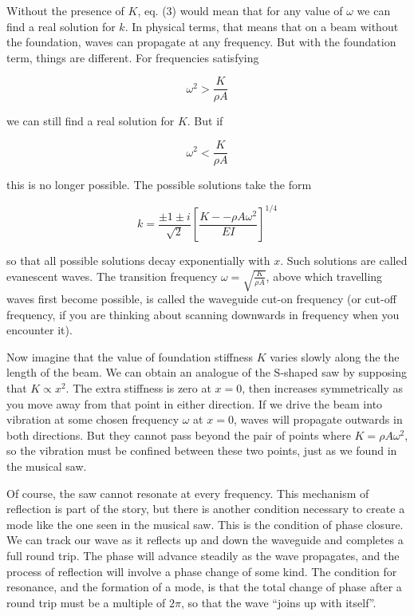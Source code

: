   Without the presence of $K$, eq. (3) would mean that for any value of 
  $\omega$ we can find a real solution for $k$. In physical terms, that means 
  that on a beam without the foundation, waves can propagate at any frequency. 
  But with the foundation term, things are different. For frequencies 
  satisfying 

  \begin{equation*}\omega^2 > \frac{K}{\rho A} \tag{4}\end{equation*} 

  \noindent{}we can still find a real solution for $K$. But if 

  \begin{equation*}\omega^2 < \frac{K}{\rho A} \tag{5}\end{equation*} 

  \noindent{}this is no longer possible. The possible solutions take the form 

  \begin{equation*}k=\frac{\pm 1 \pm i}{\sqrt{2}} \left[\dfrac{K -- \rho A 
  \omega^2 }{EI} \right]^{1/4} \tag{6}\end{equation*} 

  \noindent{}so that all possible solutions decay exponentially with $x$. Such 
  solutions are called evanescent waves. The transition frequency $\omega = 
  \sqrt{\frac{K}{\rho A} }$, above which travelling waves first become 
  possible, is called the waveguide cut-on frequency (or cut-off frequency, if 
  you are thinking about scanning downwards in frequency when you encounter 
  it). 

  Now imagine that the value of foundation stiffness $K$ varies slowly along 
  the the length of the beam. We can obtain an analogue of the S-shaped saw by 
  supposing that $K \propto x^2$. The extra stiffness is zero at $x=0$, then 
  increases symmetrically as you move away from that point in either direction. 
  If we drive the beam into vibration at some chosen frequency $\omega$ at 
  $x=0$, waves will propagate outwards in both directions. But they cannot pass 
  beyond the pair of points where $K=\rho A \omega^2$, so the vibration must be 
  confined between these two points, just as we found in the musical saw. 

  Of course, the saw cannot resonate at every frequency. This mechanism of 
  reflection is part of the story, but there is another condition necessary to 
  create a mode like the one seen in the musical saw. This is the condition of 
  phase closure. We can track our wave as it reflects up and down the waveguide 
  and completes a full round trip. The phase will advance steadily as the wave 
  propagates, and the process of reflection will involve a phase change of some 
  kind. The condition for resonance, and the formation of a mode, is that the 
  total change of phase after a round trip must be a multiple of $2 \pi$, so 
  that the wave ``joins up with itself''. 